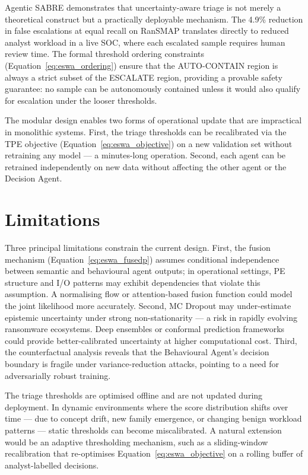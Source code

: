 Agentic SABRE demonstrates that uncertainty-aware triage is not merely a theoretical construct but a practically deployable mechanism. The 4.9\% reduction in false escalations at equal recall on RanSMAP translates directly to reduced analyst workload in a live SOC, where each escalated sample requires human review time. The formal threshold ordering constraints (Equation~\eqref{eq:eswa_ordering}) ensure that the AUTO-CONTAIN region is always a strict subset of the ESCALATE region, providing a provable safety guarantee: no sample can be autonomously contained unless it would also qualify for escalation under the looser thresholds.

The modular design enables two forms of operational update that are impractical in monolithic systems. First, the triage thresholds can be recalibrated via the TPE objective (Equation~\eqref{eq:eswa_objective}) on a new validation set without retraining any model — a minutes-long operation. Second, each agent can be retrained independently on new data without affecting the other agent or the Decision Agent.


\section{Limitations}
\label{sec:eswa_limitations}

Three principal limitations constrain the current design. First, the fusion mechanism (Equation~\eqref{eq:eswa_fusedp}) assumes conditional independence between semantic and behavioural agent outputs; in operational settings, PE structure and I/O patterns may exhibit dependencies that violate this assumption. A normalising flow or attention-based fusion function could model the joint likelihood more accurately. Second, MC Dropout may under-estimate epistemic uncertainty under strong non-stationarity — a risk in rapidly evolving ransomware ecosystems. Deep ensembles or conformal prediction frameworks \cite{yumlembam2024comprehensive} could provide better-calibrated uncertainty at higher computational cost. Third, the counterfactual analysis reveals that the Behavioural Agent's decision boundary is fragile under variance-reduction attacks, pointing to a need for adversarially robust training.

The triage thresholds are optimised offline and are not updated during deployment. In dynamic environments where the score distribution shifts over time — due to concept drift, new family emergence, or changing benign workload patterns — static thresholds can become miscalibrated. A natural extension would be an adaptive thresholding mechanism, such as a sliding-window recalibration that re-optimises Equation~\eqref{eq:eswa_objective} on a rolling buffer of analyst-labelled decisions.

